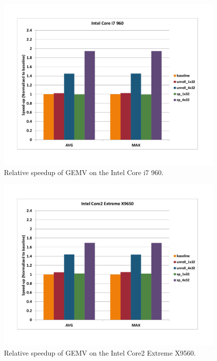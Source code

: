 \documentclass[10pt]{article}
\begin{document}
\begin{figure}[ht]
\begin{center}
\includegraphics[scale=.5]{gemv_intel_core_i7_960.png}
\end{center}
\caption{Relative speedup of GEMV on the Intel Core i7 960.}
\label{fig:gemv_corei7}
\end{figure}

\begin{figure}[ht]
\begin{center}
\includegraphics[scale=.5]{gemv_core2_extreme_x9650.png}
\end{center}
\caption{Relative speedup of GEMV on the Intel Core2 Extreme X9560.}
\label{fig:gemv_core2}
\end{figure}
\end{document}
